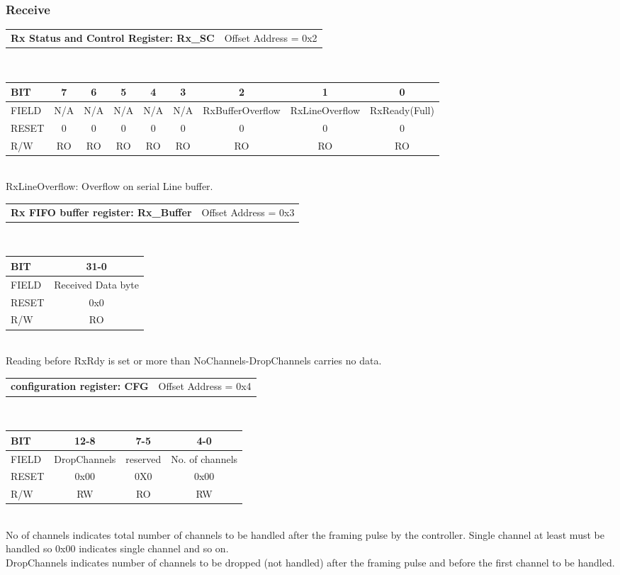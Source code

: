 \documentclass[a4paper,11pt]{article}
\begin{document}
\subsubsection{Receive}

\begin{tabular}{l l}
\textbf{Rx Status and Control Register: Rx\_SC} & Offset Address = 0x2\\
\end{tabular}\\

\begin{tabular}{|l||c|c|c|c|c|c|c|c|}
\hline
\hline
BIT   & 7 & 6 & 5 & 4 & 3 & 2 & 1 & 0\\ 
\hline
FIELD &N/A &N/A &N/A & N/A& N/A& RxBufferOverflow& RxLineOverflow& RxReady(Full)\\
\hline
RESET & 0& 0& 0& 0& 0& 0& 0& 0\\
\hline
R/W   & RO& RO& RO&   RO&  RO&   RO&  RO& RO\\
\hline
\end{tabular}\\

RxLineOverflow: Overflow on serial Line buffer.

\begin{tabular}{l l}
\textbf{Rx FIFO buffer register: Rx\_Buffer} & Offset Address = 0x3\\
\end{tabular}\\

\begin{tabular}{|l||c|}
\hline
\hline
BIT   & 31-0\\ 
\hline
FIELD & Received Data byte\\
\hline
RESET & 0x0\\
\hline
R/W   & RO\\
\hline
\end{tabular}\\
Reading before RxRdy is set or more than NoChannels-DropChannels carries no data.

\begin{tabular}{l l}
\textbf{configuration register: CFG} & Offset Address = 0x4\\
\end{tabular}\\

\begin{tabular}{|l||c|c|c|}
\hline
\hline
BIT  & 12-8 &7-5 &4-0\\ 
\hline
FIELD & DropChannels & reserved & No. of channels\\
\hline
RESET & 0x00 & 0X0 &0x00\\
\hline
R/W   & RW& RO & RW\\
\hline
\end{tabular}\\
No of channels indicates total number of channels to be handled after the framing pulse by the controller. Single channel at least must be handled so 0x00 indicates single channel and so on.\\
DropChannels indicates number of channels to be dropped (not handled) after the framing pulse and before the first channel to be handled.\\
\end{document}
